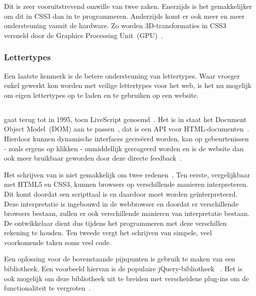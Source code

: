 Dit is zeer vooruitstrevend omwille van twee zaken. 
Enerzijds is het gemakkelijker om dit in CSS3 dan in \js{} te programmeren. 
Anderzijds komt er ook meer en meer ondersteuning vanuit de hardware. 
Zo worden 3D-transformaties in CSS3 versneld door de Graphics Processing Unit~(GPU)~\cite{Hales2012,Kool2012}.

\subsubsection{Lettertypes}
Een laatste kenmerk is de betere ondersteuning van lettertypes. 
Waar vroeger enkel gewerkt kon worden met veilige lettertypes voor het web, is het nu mogelijk om eigen lettertypes op te laden en te gebruiken op een website.

\subsection{\js}
\label{ref:javascript}
\js{} gaat terug tot in 1995, toen LiveScript genoemd~\cite{McFarland2011}. 
Het is in staat het Document Object Model~(DOM) aan te passen~\cite{PhilDutson2012},  dat is een API voor HTML-documenten~\cite{Hegaret2004}. 
Hierdoor kunnen dynamische interfaces gecreëerd worden, kan op gebeurtenissen - zoals ergens op klikken - onmiddellijk gereageerd worden en is de website dan ook meer bruikbaar geworden door deze directe feedback~\cite{McFarland2011}.

Het schrijven van \js{} is niet gemakkelijk om twee redenen~\cite{McFarland2011}. 
Ten eerste, vergelijkbaar met HTML5 en CSS3, kunnen browsers \js{} op verschillende manieren interpreteren. 
Dit komt doordat \js{} een scripttaal is en daardoor moet worden geïnterpreteerd.
Deze interpretatie is ingebouwd in de webbrowser en doordat er verschillende browsers bestaan, zullen er ook verschillende manieren van interpretatie bestaan.
De ontwikkelaar dient dus tijdens het programmeren met deze verschillen rekening te houden. 
Ten tweede vergt het schrijven van simpele, veel voorkomende taken soms veel code.

Een oplossing voor de bovenstaande pijnpunten is gebruik te maken van een bibliotheek. 
Een voorbeeld hiervan is de populaire jQuery-bibliotheek~\cite{JQuery2013a} . 
Het is ook mogelijk om deze bibliotheek uit te breiden met verscheidene plug-ins om de functionaliteit te vergroten~\cite{McFarland2011}.


